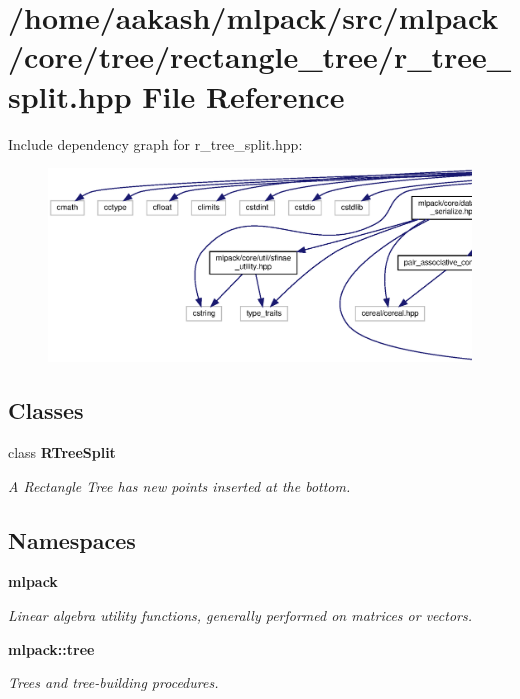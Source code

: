 \section{/home/aakash/mlpack/src/mlpack/core/tree/rectangle\+\_\+tree/r\+\_\+tree\+\_\+split.hpp File Reference}
\label{r__tree__split_8hpp}
Include dependency graph for r\+\_\+tree\+\_\+split.\+hpp\+:
\nopagebreak
\begin{figure}[H]
\begin{center}
\leavevmode
\includegraphics[width=350pt]{r__tree__split_8hpp__incl}
\end{center}
\end{figure}
\subsection*{Classes}
\begin{DoxyCompactItemize}
\item 
class \textbf{ R\+Tree\+Split}
\begin{DoxyCompactList}\small\item\em A Rectangle Tree has new points inserted at the bottom. \end{DoxyCompactList}\end{DoxyCompactItemize}
\subsection*{Namespaces}
\begin{DoxyCompactItemize}
\item 
 \textbf{ mlpack}
\begin{DoxyCompactList}\small\item\em Linear algebra utility functions, generally performed on matrices or vectors. \end{DoxyCompactList}\item 
 \textbf{ mlpack\+::tree}
\begin{DoxyCompactList}\small\item\em Trees and tree-\/building procedures. \end{DoxyCompactList}\end{DoxyCompactItemize}


